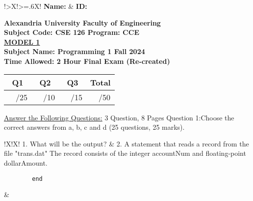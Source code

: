 \documentclass[12pt]{article}
\begin{document}
{
    \def\arraystretch{2}
    \noindent
    \begin{tabularx}{\linewidth}{!{\vrule width 1pt}>{\hsize}X!{\vrule width 1pt}>{\hsize=.6\hsize}X!{\vrule width 1pt}}
        \textbf{Name:} & \textbf{ID:}\\
    \end{tabularx}
}


{\begin{center}
    \bfseries
    \vspace{0.5cm}
    Alexandria University \hfill Faculty of Engineering\\
    \vspace{0.25cm}
    Subject Code: CSE 126 \hfill Program: CCE \\
    \underline{MODEL 1}\\
    Subject Name: Programming 1 \hfill Fall 2024 \\
    \vspace{0.25cm}
    Time Allowed: 2 Hour \hfill Final Exam (Re-created)\\
    \vspace{0.5cm}
    \normalfont
    \begin{tabular}{|c|c|c|c|}
        \hline
        Q1 & Q2 & Q3 & Total \\
        \hline
        ~~/25 & ~~/10 & ~~/15 & ~~/50\\
        \hline
    \end{tabular}
\end{center}
}


\vspace{1cm}

\underline{Answer the Following Questions:} 3 Question, 8 Pages
Question 1:Choose the correct answers from a, b, c and d (25 questions, 25 marks).\\

\fontsize{10}{12}\selectfont
\begin{tabularx}{\linewidth}{!{\vrule width 1pt}X!{\vrule width 1pt}X!{\vrule width 1pt}}
    1. What will be the output? & 2. A statement that reads a record from the file "trans.dat" The record consists of the integer accountNum and floating-point dollarAmount.\\
    \begin{lstlisting}
        end
    \end{lstlisting} & \\
\end{tabularx}
\end{document}
